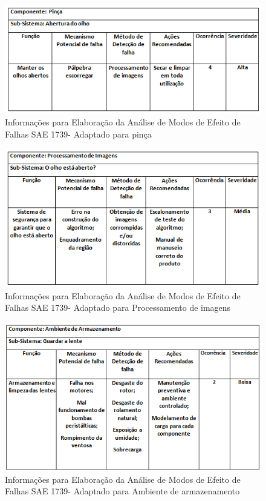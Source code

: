 \begin{figure}[H]
		\centering
			\includegraphics[scale=1.0]{figuras/confipinca.png}
		\caption{Informações para Elaboração da Análise de Modos de Efeito de Falhas SAE 1739- Adaptado para pinça \cite{sae}}
		\label{confipinca}
\end{figure}

\begin{figure}[H]
		\centering
			\includegraphics[scale=1.0]{figuras/confiimagens.png}
		\caption{Informações para Elaboração da Análise de Modos de Efeito de Falhas SAE 1739- Adaptado para Processamento de imagens \cite{sae}}
		\label{confiimagens}
\end{figure}

\begin{figure}[H]
		\centering
			\includegraphics[scale=1.0]{figuras/confiarmazenamento.png}
		\caption{Informações para Elaboração da Análise de Modos de Efeito de Falhas SAE 1739- Adaptado para Ambiente de armazenamento \cite{sae}}
		\label{confiarmazenamento}
\end{figure}

